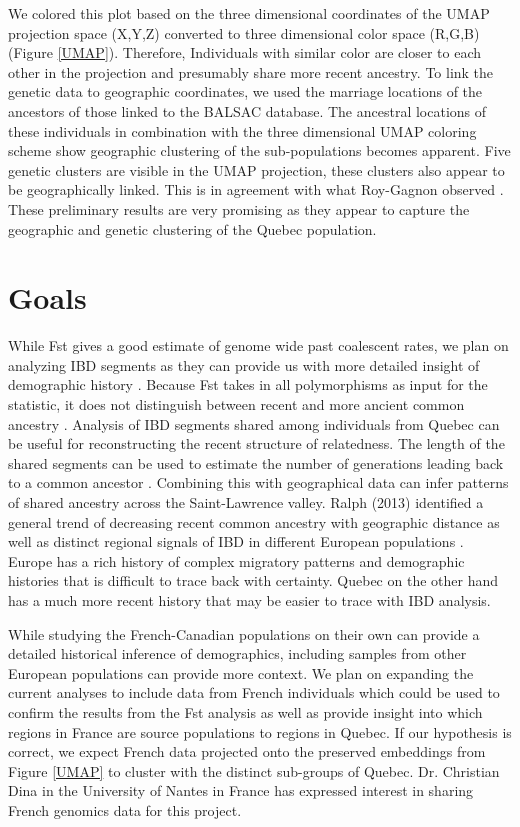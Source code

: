 \documentclass[
11pt, %
oneside, %
english, %
doublespacing, %
headsepline, %
chapterinoneline, %
]{MastersDoctoralThesis} %
\begin{document}
We colored this plot based on the three dimensional coordinates of the UMAP projection space (X,Y,Z) converted to three dimensional color space (R,G,B) (Figure \ref{UMAP}).
Therefore, Individuals with similar color are closer to each other in the projection and presumably share more recent ancestry.
To link the genetic data to geographic coordinates, we used the marriage locations of the ancestors of those linked to the BALSAC database.
The ancestral locations of these individuals in combination with the three dimensional UMAP coloring scheme show geographic clustering of the sub-populations becomes apparent.
Five genetic clusters are visible in the UMAP projection, these clusters also appear to be geographically linked.
This is in agreement with what Roy-Gagnon observed \citep{Roy-Gagnon2011}.
These preliminary results are very promising as they appear to capture the geographic and genetic clustering of the Quebec population.

\section{Goals}
While Fst gives a good estimate of genome wide past coalescent rates, we plan on analyzing IBD segments as they can provide us with more detailed insight of demographic history \citep{Charlesworth2003, Ralph2013, Baharian2016}.
Because Fst takes in all polymorphisms as input for the statistic, it does not distinguish between recent and more ancient common ancestry \citep{Ralph2013}.
Analysis of IBD segments shared among individuals from Quebec can be useful for reconstructing the recent structure of relatedness.
The length of the shared segments can be used to estimate the number of generations leading back to a common ancestor \citep{Palamara2015,Campbell2012,Baharian2016}.
Combining this with geographical data can infer patterns of shared ancestry across the Saint-Lawrence valley.
Ralph (2013) identified a general trend of decreasing recent common ancestry with geographic distance as well as distinct regional signals of IBD in different European populations \citep{Ralph2013}.
Europe has a rich history of complex migratory patterns and demographic histories that is difficult to trace back with certainty. 
Quebec on the other hand has a much more recent history that may be easier to trace with IBD analysis.

While studying the French-Canadian populations on their own can provide a detailed historical inference of demographics, including samples from other European populations can provide more context.
We plan on expanding the current analyses to include data from French individuals which could be used to confirm the results from the Fst analysis as well as provide insight into which regions in France are source populations to regions in Quebec.
If our hypothesis is correct, we expect French data projected onto the preserved embeddings from Figure \ref{UMAP} to cluster with the distinct sub-groups of Quebec.
Dr. Christian Dina in the University of Nantes in France has expressed interest in sharing French genomics data for this project.
\clearpage
\end{document}
